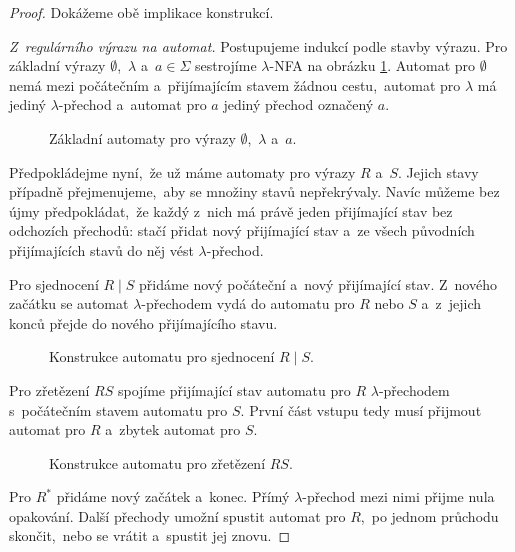 \begin{proof}
    Dokážeme obě implikace konstrukcí.

    \emph{Z~regulárního výrazu na automat.}
    Postupujeme indukcí podle stavby výrazu. Pro základní výrazy $\emptyset$,~$\lambda$ a~$a\in\Sigma$ sestrojíme $\lambda$-NFA na obrázku \ref{fig:kleene-base}. Automat pro $\emptyset$ nemá mezi počátečním a~přijímajícím stavem žádnou cestu,~automat pro $\lambda$ má jediný $\lambda$-přechod a~automat pro $a$ jediný přechod označený $a$.

    \begin{figure}[h]
        \centering
        
        \caption{Základní automaty pro výrazy $\emptyset$,~$\lambda$ a~$a$.}
        \label{fig:kleene-base}
    \end{figure}

    Předpokládejme nyní,~že už máme automaty pro výrazy $R$ a~$S$. Jejich stavy případně přejmenujeme,~aby se množiny stavů nepřekrývaly. Navíc můžeme bez újmy předpokládat,~že každý z~nich má právě jeden přijímající stav bez odchozích přechodů: stačí přidat nový přijímající stav a~ze všech původních přijímajících stavů do něj vést $\lambda$-přechod.

    Pro sjednocení $R\mid S$ přidáme nový počáteční a~nový přijímající stav. Z~nového začátku se automat $\lambda$-přechodem vydá do automatu pro $R$ nebo $S$ a~z~jejich konců přejde do nového přijímajícího stavu.

    \begin{figure}[h]
        \centering
        
        \caption{Konstrukce automatu pro sjednocení $R\mid S$.}
        \label{fig:kleene-union}
    \end{figure}

    Pro zřetězení $RS$ spojíme přijímající stav automatu pro $R$ $\lambda$-přechodem s~počátečním stavem automatu pro $S$. První část vstupu tedy musí přijmout automat pro $R$ a~zbytek automat pro $S$.

    \begin{figure}[h]
        \centering
        
        \caption{Konstrukce automatu pro zřetězení $RS$.}
        \label{fig:kleene-concat}
    \end{figure}

    Pro $R^*$ přidáme nový začátek a~konec. Přímý $\lambda$-přechod mezi nimi přijme nula opakování. Další přechody umožní spustit automat pro $R$,~po jednom průchodu skončit,~nebo se vrátit a~spustit jej znovu.


\end{proof}
